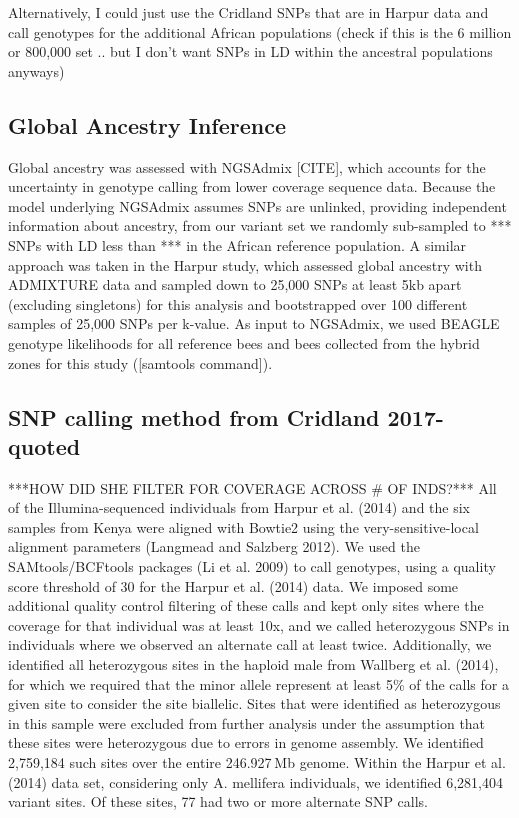 \documentclass[12pt]{report}
\begin{document}
Alternatively, I could just use the Cridland SNPs that are in Harpur data and call genotypes for the additional African populations (check if this is the 6 million or 800,000 set .. but I don't want SNPs in LD within the ancestral populations anyways)

\subsection{Global Ancestry Inference}

Global ancestry was assessed with NGSAdmix [CITE], which accounts for the uncertainty in genotype calling from lower coverage sequence data. Because the model underlying NGSAdmix assumes SNPs are unlinked, providing independent information about ancestry, from our variant set we randomly sub-sampled to *** SNPs with LD less than *** in the African reference population. A similar approach was taken in the Harpur study, which assessed global ancestry with ADMIXTURE data and sampled down to 25,000 SNPs at least 5kb apart (excluding singletons) for this analysis and bootstrapped over 100 different samples of 25,000 SNPs per k-value. As input to NGSAdmix, we used BEAGLE genotype likelihoods for all reference bees and bees collected from the hybrid zones for this study ([samtools command]).
\subsection{SNP calling method from Cridland 2017-quoted}
***HOW DID SHE FILTER FOR COVERAGE ACROSS \# OF INDS?***
All of the Illumina-sequenced individuals from Harpur et al. (2014) and the six samples from Kenya were aligned with Bowtie2 using the very-sensitive-local alignment parameters (Langmead and Salzberg 2012).
We used the SAMtools/BCFtools packages (Li et al. 2009) to call genotypes, using a quality score threshold of 30 for the Harpur et al. (2014) data. We imposed some additional quality control filtering of these calls and kept only sites where the coverage for that individual was at least 10x, and we called heterozygous SNPs in individuals where we observed an alternate call at least twice. 
Additionally, we identified all heterozygous sites in the haploid male from Wallberg et al. (2014), for which we required that the minor allele represent at least 5\% of the calls for a given site to consider the site biallelic. Sites that were identified as heterozygous in this sample were excluded from further analysis under the assumption that these sites were heterozygous due to errors in genome assembly. We identified 2,759,184 such sites over the entire 246.927 Mb genome.
Within the Harpur et al. (2014) data set, considering only A. mellifera individuals, we identified 6,281,404 variant sites. Of these sites, 77 had two or more alternate SNP calls.
\end{document}
